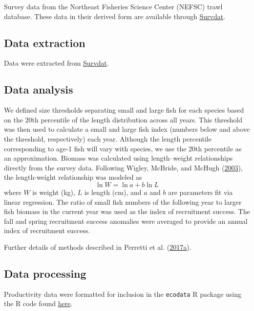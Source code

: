 \documentclass[
]{book}
\begin{document}
Survey data from the Northeast Fisheries Science Center (NEFSC) trawl database. These data in their derived form are available through \protect\hyperlink{survdat}{Survdat}.

\hypertarget{data-extraction-25}{%
\subsection{Data extraction}\label{data-extraction-25}}

Data were extracted from \protect\hyperlink{survdat}{Survdat}.

\hypertarget{data-analysis-26}{%
\subsection{Data analysis}\label{data-analysis-26}}

We defined size thresholds separating small and large fish for each species based on the 20th percentile of the length distribution across all years. This threshold was then used to calculate a small and large fish index (numbers below and above the threshold, respectively) each year. Although the length percentile corresponding to age-1 fish will vary with species, we use the 20th percentile as an approximation. Biomass was calculated using length--weight relationships directly from the survey data. Following Wigley, McBride, and McHugh (\protect\hyperlink{ref-wigley_length-weight_2003}{2003}), the length-weight relationship was modeled as
\[\ln W = \ln a + b \ln L\]
where \(W\) is weight (kg), \(L\) is length (cm), and \(a\) and \(b\) are parameters fit via linear regression. The ratio of small fish numbers of the following year to larger fish biomass in the current year was used as the index of recruitment success. The fall and spring recruitment success anomalies were averaged to provide an annual index of recruitment success.

Further details of methods described in Perretti et al. (\protect\hyperlink{ref-perretti_regime_2017}{2017}\protect\hyperlink{ref-perretti_regime_2017}{a}).

\hypertarget{data-processing-19}{%
\subsection{Data processing}\label{data-processing-19}}

Productivity data were formatted for inclusion in the \texttt{ecodata} R package using the R code found \href{https://github.com/NOAA-EDAB/ecodata/blob/master/data-raw/get_productivity_anomaly.R}{here}.
\end{document}
